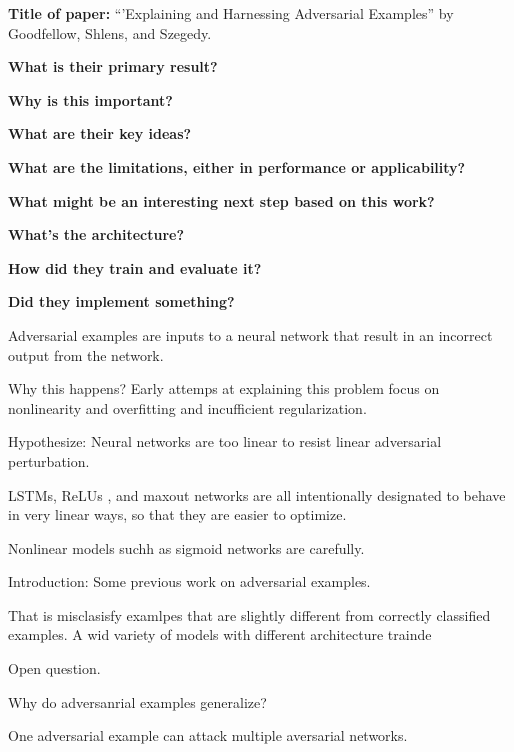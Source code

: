 \noindent \textbf{Title of paper:} ``'Explaining and Harnessing Adversarial
Examples'' by Goodfellow, Shlens, and Szegedy. 

\noindent\textbf{What is their primary result?}

\noindent\textbf{Why is this important?}

\noindent\textbf{What are their key ideas?}

\noindent\textbf{What are the limitations, either in performance or applicability?}

\noindent\textbf{What might be an interesting next step based on this work?}

\noindent\textbf{What's the architecture?}

\noindent\textbf{How did they train and evaluate it?}

\noindent\textbf{Did they implement something?}

Adversarial examples are inputs to a neural network that result in an incorrect
output from the network.

Why this happens? Early attemps at explaining this problem focus on nonlinearity
and overfitting and incufficient regularization.

Hypothesize: Neural networks are too linear to resist linear adversarial
perturbation.

LSTMs, ReLUs , and maxout networks are all intentionally designated to behave in
very linear ways, so that they are easier to optimize.

Nonlinear models suchh as sigmoid networks are carefully.

Introduction: Some previous work on adversarial examples.

That is misclasisfy examlpes that are slightly different from correctly
classified examples.
A wid variety of models with different architecture trainde

Open question.

Why do adversanrial examples generalize?

One adversarial example can attack multiple aversarial networks.





